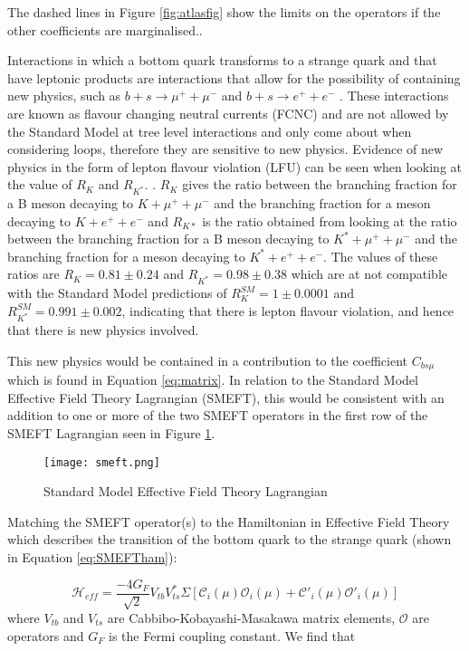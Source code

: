 \documentclass[11pt,oneside,a4paper]{article}
\begin{document}
The dashed lines in Figure \ref{fig:atlasfig} show the limits on the operators if the other coefficients are marginalised.\cite{highptdilepton}.

Interactions in which a bottom quark transforms to a strange quark and that have leptonic products are interactions that allow for the possibility of containing new physics, such as $b + s \rightarrow \mu^{+} + \mu^{-}$ and $b + s \rightarrow e^{+} + e^{-}$ \cite{b2s}. These interactions are known as flavour changing neutral currents (FCNC) and are not allowed by the Standard Model at tree level interactions and only come about when considering loops, therefore they are sensitive to new physics. Evidence of new physics in the form of lepton flavour violation (LFU) can be seen when looking at the value of $R_{K}$ and $R_{K^{*}}$. \cite{b2s}. $R_{K}$ gives the ratio between the branching fraction for a B meson decaying to $K + \mu^{+} +\mu^{-}$  and the branching fraction for a  meson decaying to $K + e^{+} +e^{-}$ and $R_{K*}$ is the ratio obtained from looking at the ratio between the  branching fraction for a B meson decaying to $K^{*} + \mu^{+} +\mu^{-}$  and the branching fraction for a  meson decaying to $K^{*} + e^{+} +e^{-}$. The values of these ratios are $R_{K} = 0.81 \pm 0.24$ and $R_{K^{*}} = 0.98 \pm 0.38$ which are at not compatible with the Standard Model predictions of $R_{K}^{SM} = 1 \pm 0.0001$ and $R_{K^{*}}^{SM} = 0.991 \pm 0.002$, indicating that there is lepton flavour violation, and hence that there is new physics involved.

This new physics would be contained in a contribution to the coefficient $C_{bs\mu}$ which is found in Equation \ref{eq:matrix}. In relation to the Standard Model Effective Field Theory Lagrangian (SMEFT), this would be consistent with an addition to one or more of the two SMEFT operators in the first row of the SMEFT Lagrangian seen in Figure \ref{fig:SMEFT}.

\begin{figure}[htbp]
	\centering
	\texttt{[image: smeft.png]}
	\caption{Standard Model Effective Field Theory Lagrangian}
	\label{fig:SMEFT}
\end{figure}

Matching the SMEFT operator(s) to the Hamiltonian in Effective Field Theory which describes the transition of the bottom quark to the strange quark (shown in Equation \ref{eq:SMEFTham}):

\begin{equation}
\label{eq:SMEFTham}
\mathcal{H}_{eff} = \frac{-4G_{F}}{\sqrt{2}}V_{tb}V_{ts}^{*}\Sigma[\mathcal{C}_{i}(\mu)\mathcal{O}_{i}(\mu)+\mathcal{C'}_{i}(\mu)\mathcal{O'}_{i}(\mu)]
\end{equation}	
where $V_{tb}$ and $V_{ts}$ are Cabbibo-Kobayashi-Masakawa matrix elements, $\mathcal{O}$ are operators and $G_{F}$ is the Fermi coupling constant. We find that
\end{document}
